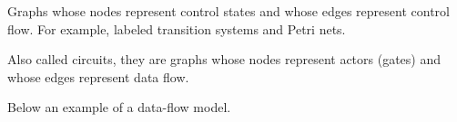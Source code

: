 \begin{definition}
	Graphs whose nodes represent control states and whose edges represent control flow. 
	For example, labeled transition systems and Petri nets.
\end{definition}

\begin{definition}
	Also called circuits, they are graphs whose nodes represent actors (gates) and whose edges represent data flow. 
\end{definition}

\begin{example}
    Below an example of a data-flow model.
    \begin{center}
    \end{center}
\end{example}





